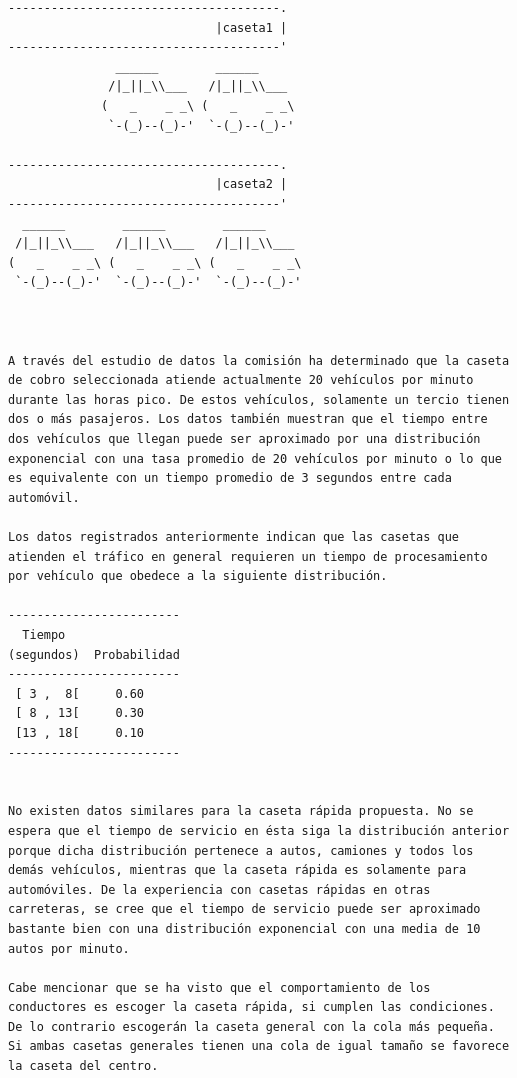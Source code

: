 \begin{verbatim}
--------------------------------------.
                             |caseta1 |
--------------------------------------'
               ______        ______
              /|_||_\\___   /|_||_\\___
             (   _    _ _\ (   _    _ _\
              `-(_)--(_)-'  `-(_)--(_)-'

--------------------------------------.
                             |caseta2 |
--------------------------------------'
  ______        ______        ______
 /|_||_\\___   /|_||_\\___   /|_||_\\___
(   _    _ _\ (   _    _ _\ (   _    _ _\
 `-(_)--(_)-'  `-(_)--(_)-'  `-(_)--(_)-'



A través del estudio de datos la comisión ha determinado que la caseta de cobro seleccionada atiende actualmente 20 vehículos por minuto durante las horas pico. De estos vehículos, solamente un tercio tienen dos o más pasajeros. Los datos también muestran que el tiempo entre dos vehículos que llegan puede ser aproximado por una distribución exponencial con una tasa promedio de 20 vehículos por minuto o lo que es equivalente con un tiempo promedio de 3 segundos entre cada automóvil.

Los datos registrados anteriormente indican que las casetas que atienden el tráfico en general requieren un tiempo de procesamiento por vehículo que obedece a la siguiente distribución.

------------------------
  Tiempo
(segundos)  Probabilidad
------------------------
 [ 3 ,  8[     0.60
 [ 8 , 13[     0.30
 [13 , 18[     0.10
------------------------


No existen datos similares para la caseta rápida propuesta. No se espera que el tiempo de servicio en ésta siga la distribución anterior porque dicha distribución pertenece a autos, camiones y todos los demás vehículos, mientras que la caseta rápida es solamente para automóviles. De la experiencia con casetas rápidas en otras carreteras, se cree que el tiempo de servicio puede ser aproximado bastante bien con una distribución exponencial con una media de 10 autos por minuto.

Cabe mencionar que se ha visto que el comportamiento de los conductores es escoger la caseta rápida, si cumplen las condiciones. De lo contrario escogerán la caseta general con la cola más pequeña. Si ambas casetas generales tienen una cola de igual tamaño se favorece la caseta del centro.



\end{verbatim}
